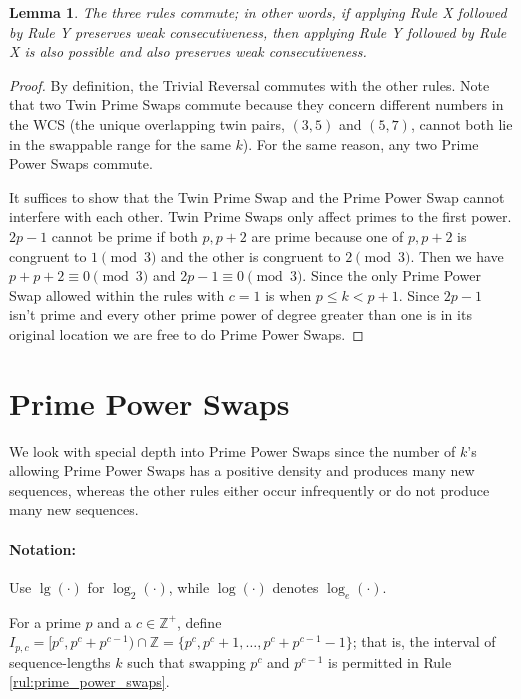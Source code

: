 \documentclass{article}
\newcommand{\Z}{\mathbb{Z}}
\newtheorem{lemma}[theorem]{Lemma}
\theoremstyle{definition}
\theoremstyle{remark}
\numberwithin{equation}{section}
\numberwithin{case}{theorem}
\begin{document}
\begin{lemma}
The three rules commute; in other words, if applying Rule X followed by Rule Y preserves weak consecutiveness, then applying Rule Y followed by Rule X is also possible and also preserves weak consecutiveness.
\end{lemma}
\begin{proof}
By definition, the Trivial Reversal commutes with the other rules. Note that two Twin Prime Swaps commute because they concern different numbers in the WCS (the unique overlapping twin pairs, $(3,5)$ and $(5,7)$, cannot both lie in the swappable range for the same $k$). For the same reason, any two Prime Power Swaps commute.

It suffices to show that the Twin Prime Swap and the Prime Power Swap cannot interfere with each other. Twin Prime Swaps only affect primes to the first power. $2p-1$ cannot be prime if both $p,p+2$ are prime because one of $p,p+2$ is congruent to $1 \pmod 3$ and the other is congruent to $2 \pmod 3$. Then we have $p+p+2 \equiv 0\pmod 3$ and $2p-1\equiv 0\pmod 3$. Since the only Prime Power Swap allowed within the rules with $c=1$ is when $p\leq k<p+1$. Since $2p-1$ isn't prime and every other prime power of degree greater than one is in its original location we are free to do Prime Power Swaps.   
\end{proof}





\section{Prime Power Swaps} \label{sec:primepowerswaps}


We look with special depth into Prime Power Swaps since the number of $k$'s allowing Prime Power Swaps has a positive density and produces many new sequences, whereas the other rules either occur infrequently or do not produce many new sequences.

\paragraph{Notation:} Use $\lg(\cdot)$ for $\log_2(\cdot)$, while $\log(\cdot)$ denotes $\log_e(\cdot)$.

For a prime $p$ and a $c \in \Z^+$, define $I_{p,c} = [p^c, p^c + p^{c-1}) \cap \Z = \{ p^c, p^c + 1, \dots, p^c + p^{c-1} - 1 \}$; that is, the interval of sequence-lengths $k$ such that swapping $p^c$ and $p^{c-1}$ is permitted in Rule \ref{rul:prime_power_swaps}.
\end{document}
